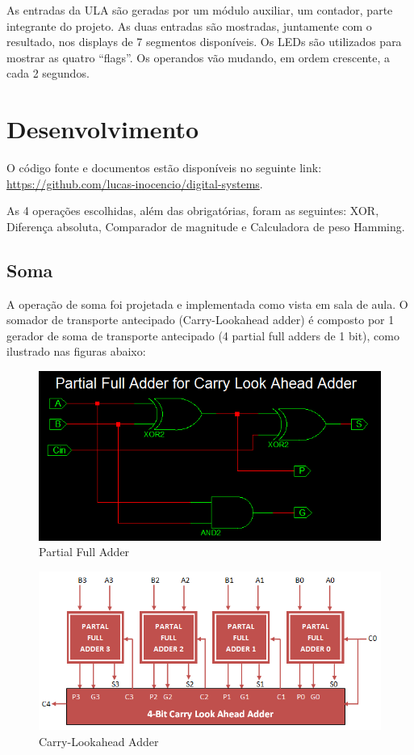 \documentclass[12pt]{article}
\begin{document}
As entradas da ULA são geradas por um módulo auxiliar, um contador, parte integrante do projeto. As duas entradas são mostradas, juntamente com o resultado, nos displays de 7 segmentos disponíveis. Os LEDs são utilizados para mostrar as quatro “flags”. Os operandos vão mudando, em ordem crescente, a cada 2 segundos.

\section{Desenvolvimento}

O código fonte e documentos estão disponíveis no seguinte link: \url{https://github.com/lucas-inocencio/digital-systems}.

As 4 operações escolhidas, além das obrigatórias, foram as seguintes: XOR, Diferença absoluta, Comparador de magnitude e Calculadora de peso Hamming.

\subsection*{Soma}

A operação de soma foi projetada e implementada como vista em sala de aula. O somador de transporte antecipado (Carry-Lookahead adder) é composto por 1 gerador de soma de transporte antecipado (4 partial full adders de 1 bit), como ilustrado nas figuras abaixo:

\begin{figure}[ht]
    \centering
    \includegraphics[scale=0.5]{partial-full-adder.png}
    \caption{Partial Full Adder}
    \label{fig:Partial Full Adder}
\end{figure}

\begin{figure}[ht]
    \centering
    \includegraphics[scale=0.5]{cla-adder.png}
    \caption{Carry-Lookahead Adder}
    \label{fig:Carry-LookAhead Adder}
\end{figure}
\end{document}
